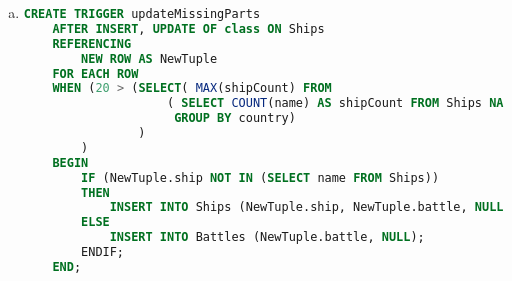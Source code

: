 \documentclass[12pt]{article}
\begin{document}
\begin{enumerate}[1.]
\begin{enumerate}[a)]
        \item

    \begin{lstlisting}[language=SQL]
    CREATE TRIGGER updateMissingParts
    AFTER INSERT, UPDATE OF class ON Ships
    REFERENCING
        NEW ROW AS NewTuple
    FOR EACH ROW
    WHEN (20 > (SELECT( MAX(shipCount) FROM
                    ( SELECT COUNT(name) AS shipCount FROM Ships NATURAL JOIN Classes
                     GROUP BY country)
                )
        )
    BEGIN
        IF (NewTuple.ship NOT IN (SELECT name FROM Ships))
        THEN
            INSERT INTO Ships (NewTuple.ship, NewTuple.battle, NULL);
        ELSE
            INSERT INTO Battles (NewTuple.battle, NULL);
        ENDIF;
    END;
    \end{lstlisting}

    \end{enumerate}

\end{enumerate}
\end{document}
